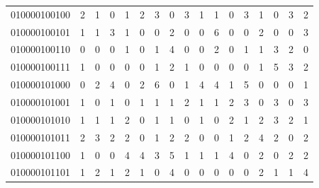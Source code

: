 \documentclass[10pt,a4paper]{article}
\begin{document}
\begin{longtable}{ |c|c|c|c|c|c|c|c|c|c|c|c|c|c|c|c|c| }
    010000100100              & 2                            & 1                                & 0                            & 1                              & 2   & 3   & 0   & 3   & 1   & 1   & 0   & 3   & 1   & 0   & 3   & 2   \\
    010000100101              & 1                            & 1                                & 3                            & 1                              & 0   & 0   & 2   & 0   & 0   & 6   & 0   & 0   & 2   & 0   & 0   & 3   \\
    010000100110              & 0                            & 0                                & 0                            & 1                              & 0   & 1   & 4   & 0   & 0   & 2   & 0   & 1   & 1   & 3   & 2   & 0   \\
    010000100111              & 1                            & 0                                & 0                            & 0                              & 0   & 1   & 2   & 1   & 0   & 0   & 0   & 0   & 1   & 5   & 3   & 2   \\
    010000101000              & 0                            & 2                                & 4                            & 0                              & 2   & 6   & 0   & 1   & 4   & 4   & 1   & 5   & 0   & 0   & 0   & 1   \\
    010000101001              & 1                            & 0                                & 1                            & 0                              & 1   & 1   & 1   & 2   & 1   & 1   & 2   & 3   & 0   & 3   & 0   & 3   \\
    010000101010              & 1                            & 1                                & 1                            & 2                              & 0   & 1   & 1   & 0   & 1   & 0   & 2   & 1   & 2   & 3   & 2   & 1   \\
    010000101011              & 2                            & 3                                & 2                            & 2                              & 0   & 1   & 2   & 2   & 0   & 0   & 1   & 2   & 4   & 2   & 0   & 2   \\
    010000101100              & 1                            & 0                                & 0                            & 4                              & 4   & 3   & 5   & 1   & 1   & 1   & 4   & 0   & 2   & 0   & 2   & 2   \\
    010000101101              & 1                            & 2                                & 1                            & 2                              & 1   & 0   & 4   & 0   & 0   & 0   & 0   & 0   & 2   & 1   & 1   & 4   \\

\end{longtable}
\end{document}
